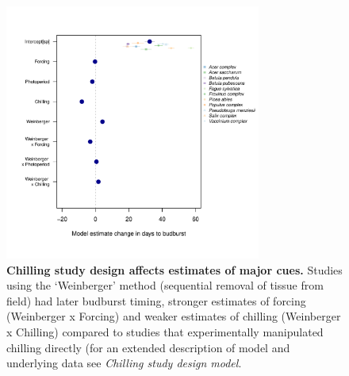 \documentclass{article}
\begin{document}
\newpage
\newpage
\begin{figure}[h!]
\centering
\noindent \includegraphics[width=0.75\textwidth]{..//..//analyses/figures/weinberger_MU_4supp.pdf}
\caption{\textbf{Chilling study design affects estimates of major cues.} Studies using the `Weinberger' method (sequential removal of tissue from field) had later budburst timing, stronger estimates of forcing (Weinberger x Forcing) and weaker estimates of chilling (Weinberger x Chilling) compared to studies that experimentally manipulated chilling directly (for an extended description of model and underlying data see \emph{Chilling study design model}.}
\label{fig:weinberger}
\end{figure}
\end{document}
